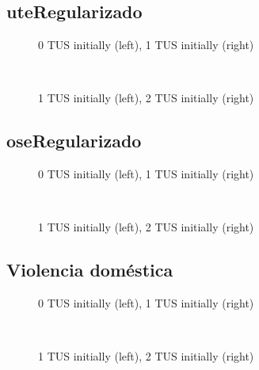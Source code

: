\documentclass[12pt]{article}
\begin{document}
\subsection{uteRegularizado}
\begin{figure}[H]%
	\centering
	\caption*{0 TUS initially (left), 1 TUS initially (right)}
	 \quad 
	 \\
	
	\caption*{1 TUS initially (left), 2 TUS initially (right)}
	 \qquad
	\label{fig:uteRegularizadoTwo}%
\end{figure}

\subsection{oseRegularizado}
\begin{figure}[H]%
	\centering
	\caption*{0 TUS initially (left), 1 TUS initially (right)}
	 \quad 
	 \\
	
	\caption*{1 TUS initially (left), 2 TUS initially (right)}
	 \qquad
	\label{fig:oseRegularizadoTwo}%
\end{figure}

\subsection{Violencia doméstica}
\begin{figure}[H]%
	\centering
	\caption*{0 TUS initially (left), 1 TUS initially (right)}
	 \quad 
	 \\
	
	\caption*{1 TUS initially (left), 2 TUS initially (right)}
	 \qquad
	\label{fig:vdTwo}%
\end{figure}
\end{document}
